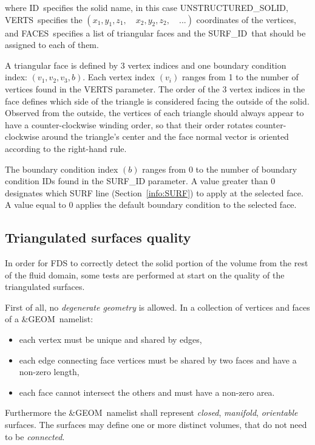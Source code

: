 \documentclass[12pt]{article}
\begin{document}
\noindent where {\ct ID}\ specifies the solid name, in this case {\ct UNSTRUCTURED_SOLID},
{\ct VERTS}\ specifies the $(x_1,y_1,z_1, \quad x_2,y_2,z_2, \quad ...)$ coordinates of the vertices,
and {\ct FACES}\ specifies a list of triangular faces and the {\ct SURF_ID}\ that should be
assigned to each of them.

A triangular face is defined by 3 vertex indices and one boundary condition index: $(v_1,v_2,v_3,b)$.
Each vertex index $(v_i)$ ranges from 1 to the number of vertices found in the {\ct VERTS} parameter.
The order of the 3 vertex indices in the face defines which side of the triangle is considered facing
the outside of the solid. Observed from the outside, the vertices of each triangle should always appear
to have a counter-clockwise winding order, so that their order rotates counter-clockwise around the
triangle's center and the face normal vector is oriented according to the right-hand rule.

The boundary condition index $(b)$ ranges from 0 to the number of boundary condition {\ct IDs} found in
the {\ct SURF_ID} parameter. A value greater than 0 designates which {\ct SURF} line (Section~\ref{info:SURF})
to apply at the selected face. A value equal to 0 applies the default boundary condition to the selected face.

\subsection{Triangulated surfaces quality}

In order for FDS to correctly detect the solid portion of the volume from the rest of the fluid domain,
some tests are performed at start on the quality of the triangulated surfaces.

First of all, no \textit{degenerate geometry} is allowed.
In a collection of vertices and faces of a {\ct \&GEOM}\ namelist:

\begin{itemize}
\item each vertex must be unique and shared by edges,
\item each edge connecting face vertices must be shared by two faces and have a non-zero length,
\item each face cannot intersect the others and must have a non-zero area.
\end{itemize}

Furthermore the {\ct \&GEOM}\ namelist shall represent \textit{closed}, \textit{manifold}, \textit{orientable} surfaces.
The surfaces may define one or more distinct volumes, that do not need to be \textit{connected}.
\end{document}
